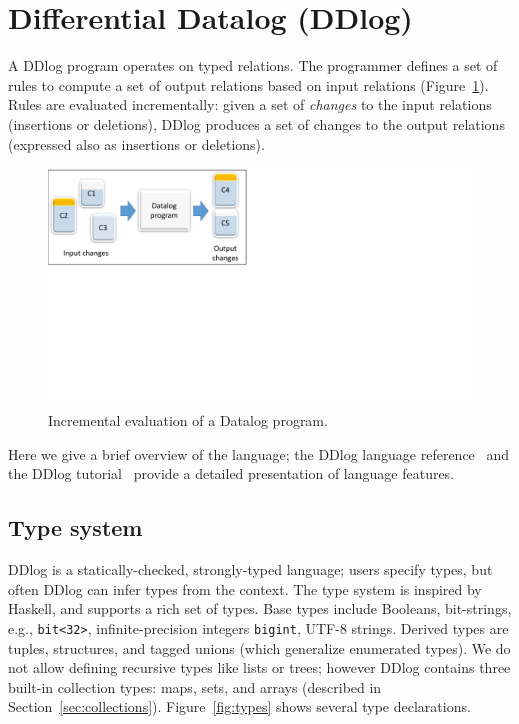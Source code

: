 \section{Differential Datalog (DDlog)}\label{sec-ddlog}

A DDlog program operates on typed relations.  The programmer defines a
set of rules to compute a set of output relations based on input
relations (Figure~\ref{fig:differential}).  Rules are evaluated
incrementally: given a set of \emph{changes} to the input relations
(insertions or deletions), DDlog produces a set of changes to the
output relations (expressed also as insertions or deletions).

\begin{figure}[t]
    \center
    \includegraphics[width=0.5\columnwidth,clip=true,trim=0in 4.4in 6.5in 0in]{differential.pdf}
    \caption{Incremental evaluation of a Datalog program.\label{fig:differential}}
\end{figure}

Here we give a brief overview of the language; the DDlog language
reference~\cite{ddlog-manual} and the DDlog
tutorial~\cite{ddlog-tutorial} provide a detailed presentation of
language features.

\subsection{Type system}

DDlog is a statically-checked, strongly-typed language; users specify
types, but often DDlog can infer types from the context.  The type
system is inspired by Haskell, and supports a rich set of types.  Base
types include Booleans, bit-strings, e.g., \texttt{bit<32>},
infinite-precision integers \texttt{bigint}, UTF-8 strings.  Derived
types are tuples, structures, and tagged unions (which generalize
enumerated types).  We do not allow defining recursive types like
lists or trees; however DDlog contains three built-in collection
types: maps, sets, and arrays (described in
Section~\ref{sec:collections}).  Figure~\ref{fig:types} shows several type declarations.

